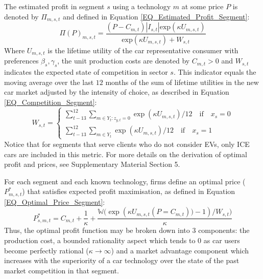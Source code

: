 \documentclass[12pt]{article}
\begin{document}
	The estimated profit in segment $s$ using a technology $m$ at some price $P$ is denoted by $\Pi_{m,s,t}$ and defined in Equation \ref{EQ_Estimated_Profit_Segment}:
	\begin{equation}
		\Pi(P)_{m,s,t} = \frac{(P-C_{m,t})|I_{s,t}|\text{exp}(\kappa U_{m,s,t})}{\text{exp}(\kappa U_{m,s,t})+W_{s,t}}
		\label{EQ_Estimated_Profit_Segment}
	\end{equation}
	Where $U_{m,s,t}$ is the lifetime utility of the car representative consumer with preferences $\beta_s,\gamma_s$, the unit production costs are denoted by $C_{m,t}>0$ and $W_{s,t}$ indicates the expected state of competition in sector $s$. This indicator equals the moving average over the last $12$ months of the sum of lifetime utilities in the new car market adjusted by the intensity of choice, as described in Equation \ref{EQ_Competition_Segment}:
	\begin{equation}
		W_{s,t} = \begin{cases}
			\sum_{t-13}^{12} \sum_{m \in Y_t : z_{y,t}=0} \exp(\kappa U_{m,s,t})/12\quad\text{if}\quad x_s =0 \\
			\sum_{t-13}^{12} \sum_{m \in Y_t} \exp(\kappa U_{m,s,t})/12\quad\text{if}\quad x_s =1
		\end{cases}
		\label{EQ_Competition_Segment}
	\end{equation}
	Notice that for segments that serve clients who do not consider EVs, only ICE cars are included in this metric. For more details on the derivation of optimal profit and prices, see Supplementary Material Section 5.

	For each segment and each known technology, firms define an optimal price ($P^*_{m,s,t}$) that satisfies expected profit maximisation, as defined in Equation \ref{EQ_Optimal_Price_Segment}:
	\begin{equation}
		P^*_{s,m,t} = C_{m,t} + \frac{1}{\kappa } +  \frac{ \mathbb{W}\bigg(\exp \left(\kappa U_{m,s,t}(P=C_{m,t}) )-1\right)/{W_{s,t}}\bigg)}{\kappa }
		\label{EQ_Optimal_Price_Segment}
	\end{equation}
	Thus, the optimal profit function may be broken down into 3 components: the production cost, a bounded rationality aspect which tends to 0 as car users become perfectly rational ($\kappa\xrightarrow{}\infty$) and a market advantage component which increases with the superiority of a car technology over the state of the past market competition in that segment.
\end{document}
